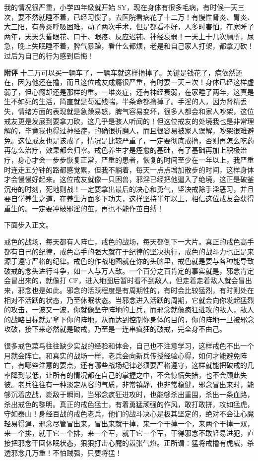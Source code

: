 \begin{case}
    我的情况很严重，小学四年级就开始 SY，现在身体有很多毛病，有时候一天三次，要不然就睡不着，已经习惯了，去医院看病花了十二万！有慢性肾炎、胃炎、大三阳，有鼻炎呼吸困难，动了两次手术，但是都看不好，人多时害怕，在家睡了两年，天天头昏眼花、口干、眼疼、反应迟钝、神经衰弱！一天上十几次厕所，尿急，晚上失眠睡不着，脾气暴躁，看什么都烦，老是和自己家人打架，都拿刀砍！过后为自己的行为感到后悔！

    \textbf{附评} 十二万可以买一辆车了，一辆车就这样撸掉了。关键是钱花了，病依然还在，因为他还在撸，而且这位戒友成瘾很严重，有时要一天三次！身体已经这样虚弱了，但心瘾却还是那样的重。一堆炎症，还有神经衰弱，在家睡了两年，这真是生不如死的生活，简直就是苟延残喘，半条命都撸掉了。手淫的人，因为肾精丢失，情绪方面的表现就是急躁易怒，脾气容易变坏，很多人都会和家人吵架，这位戒友更是发展到要拿刀砍，这几乎是骇人听闻的！但这位戒友的处境我也是非常理解的，毕竟我也得过神经症，的确很折磨人，而且很容易被家人误解，吵架很难避免。这位戒友也是该戒了，情况是比较严重了，一定要彻底戒撸，否则再怎么吃药再怎么治疗，效果都会归零。戒色养生才是痊愈的基础，有了基础再加上积极治疗，身心才会一步步恢复正常，严重的患者，恢复的时间至少在一年以上，我严重时连走五分钟的路都感觉累，但我不躺着，每天一点点增加散步的时间，这样身体才会慢慢好起来。这位戒友就像一只困兽，邪淫已经把他逼入了绝境，这正是破釜沉舟的时刻，死地则战！一定要拿出最后的决心和勇气，坚决戒除手淫恶习，并且要自学养生之道，在养生方面多下功夫，这样坚持半年以上，相信这位戒友会获得重生的。一定要冲破邪淫的茧，再也不能作茧自缚！
\end{case}

下面步入正文。

戒色的战场，每天都有人阵亡，戒色的战场，每天都倒下一大片。真正的戒色高手都有自己的纪律，戒色高手的强大就在于纪律的坚决执行，戒色的战斗力也正是来源于遵守严格的纪律。戒色的作战地图就在你的头脑里，戒色就是要与各种能导致破戒的念头进行斗争，如一人与万人敌。一个百分之百肯定的事实就是，邪念肯定会冒出来的，就像打 CF，进入地图后暂时看不到敌人，但走着走着敌人就会冒出来，邪念也是如此。邪念的活跃程度是有周期性的，有时会比较猛烈，有时则处在相对不活跃的状态，乃至休眠状态。当邪念进入活跃的周期，它就会向你发起猛烈的攻击，一波又一波，你就像坚守阵地的士兵，而邪念就像疯狂进攻的敌人，敌人的战略目标就是拿下你的阵地，从而达到控制你身体的目的，你的阵地一旦被邪念攻破，接下来必然就是破戒，乃至是一连串疯狂的破戒，完全身不由己。

很多戒色菜鸟往往缺少实战的经验和体会，自己也不注意学习，这样戒色不出一个月就会阵亡。和真实的战场一样，老兵会向新兵传授经验心得，如何才能避免阵亡，有哪些注意的要点，还有哪些战场纪律必须要严格遵守，这样就能把破戒的几率降到最低，让所有的情况都在自己的掌握之中，不会惊慌失措，也不会顾此失彼。老兵往往有一种淡定从容的气质，非常镇静，也非常稳健，邪念冒出来时，能够沉着应战，毙敌于瞬间，当邪念疯狂进攻时，也能够杀出重围，杀出一条血路，杀出戒色的黎明。真正的戒色猛士，有着勇猛顽强的作风，敢打敢拼，攻如猛虎，守如泰山！身经百战的戒色老兵，他们的战斗决心是极其坚定的，绝对不会让心魔轻易得逞，邪念尽管冒出来，冒出来就干掉，来一个干掉一个，来两个干掉一双，来一个排，就干它一个排，来一个军，就干它一个军，干得邪念不敢轻易进犯，直接把邪念干回休眠状态，狠狠打击心魔的嚣张气焰。正所谓：猛将戒撸有虎威，杀透邪念几万重！不怕贼强，只要将猛！

